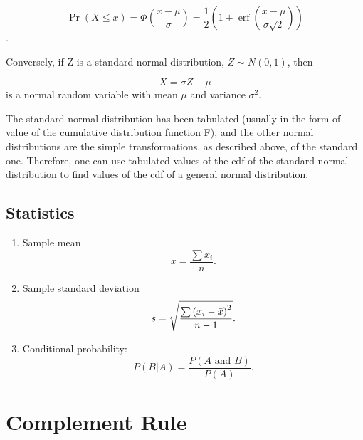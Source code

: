 \documentclass[12pt]{report}
\begin{document}
\[\Pr(X \le x)
=
\Phi
\left(
\frac{x-\mu}{\sigma}
\right)
=
\frac{1}{2}
\left(
1 + \operatorname{erf}
\left(
\frac{x-\mu}{\sigma\sqrt{2}}
\right)
\right)\]
.




Conversely, if Z is a standard normal distribution, $Z \sim N(0,1)$, then

\[X = \sigma Z + \mu\]
is a normal random variable with mean $\mu$ and variance $\sigma^2$.

The standard normal distribution has been tabulated (usually in the form of value of the cumulative distribution function F), and the other normal distributions are the simple transformations, as described above, of the standard one. Therefore, one can use tabulated values of the cdf of the standard normal distribution to 
find values of the cdf of a general normal distribution.



\subsection{Statistics}

\begin{enumerate}
	\item Sample mean
	\begin{equation*}
	\bar{x}=\frac{\sum x_{i}}{n}.
	\end{equation*}
	
	\item Sample standard deviation
	\begin{equation*}
	s=\sqrt{\frac{\sum \left( x_{i}-\bar{x}\right) ^{2}}{%
			n-1}}.
	\end{equation*}
	
	\item Conditional probability:
	\begin{equation*}
	P(B|A)=\frac{P\left( A\text{ and }B\right) }{P\left( A\right) }.
	\end{equation*}
	
	
	
	
	
	
\end{enumerate}
		\section*{Complement Rule}
		
\end{document}

